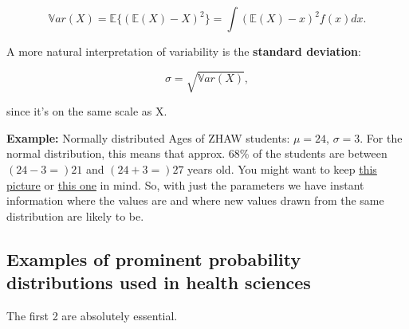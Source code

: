 \documentclass[
]{book}
\begin{document}
\[\mathbb{V}ar(X) = \mathbb{E} \{ (\mathbb{E}(X) - X)^2 \} = \int (\mathbb{E}(X) - x)^2 f(x) dx.\]

A more natural interpretation of variability is the \textbf{standard deviation}:

\[\sigma = \sqrt{\mathbb{V}ar(X)},\]

since it's on the same scale as X.

\textbf{Example:} Normally distributed Ages of ZHAW students: \(\mu = 24\), \(\sigma = 3\). For the normal distribution,
this means that approx. 68\% of the students are between \((24-3=)21\) and \((24+3=)27\) years old.
You might want to keep \href{https://en.wikipedia.org/wiki/Normal_distribution\#/media/File:Standard_deviation_diagram_micro.svg}{this picture}
or \href{https://mathbitsnotebook.com/Algebra2/Statistics/normalstandard.jpg}{this one} in mind.
So, with just the parameters we have instant information where the values are and where new values
drawn from the same distribution are likely to be.

\subsection{Examples of prominent probability distributions used in health sciences}\label{prominent_probability_distributions_in_health_sciences}

The first 2 are absolutely essential.
\end{document}
